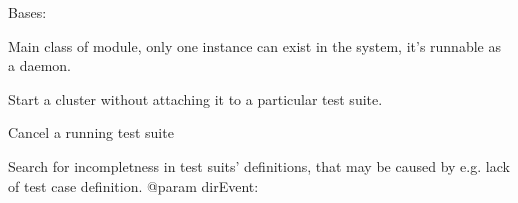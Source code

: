 \documentclass[a4paper,11pt,openany]{sphinxmanual}
\begin{document}
\begin{fulllineitems}
\label{ref-manual/XrdTestMaster:XrdTestMaster.XrdTestMaster}
Bases: {\hyperref[ref-manual/XrdTest:XrdTest.Daemon.Runnable]{}}

Main class of module, only one instance can exist in the system,
it's runnable as a daemon.

\begin{fulllineitems}
\label{ref-manual/XrdTestMaster:XrdTestMaster.XrdTestMaster.activateCluster}
Start a cluster without attaching it to a particular test suite.

\end{fulllineitems}


\begin{fulllineitems}
\label{ref-manual/XrdTestMaster:XrdTestMaster.XrdTestMaster.archiveSuiteSessions}
\end{fulllineitems}


\begin{fulllineitems}
\label{ref-manual/XrdTestMaster:XrdTestMaster.XrdTestMaster.cancelTestSuite}
Cancel a running test suite

\end{fulllineitems}


\begin{fulllineitems}
\label{ref-manual/XrdTestMaster:XrdTestMaster.XrdTestMaster.checkIfSuitsDefsComplete}
Search for incompletness in test suits' definitions, that may be caused
by e.g. lack of test case definition.
@param dirEvent:

\end{fulllineitems}



\end{fulllineitems}
\end{document}
